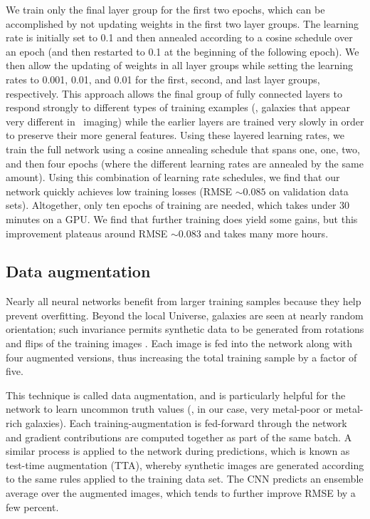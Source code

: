 \documentclass[fleqn,usenatbib]{mnras}
\begin{document}
We train only the final layer group for the first two epochs, which can be accomplished by not updating weights in the first two layer groups. The learning rate is initially set to 0.1 and then annealed according to a cosine schedule over an epoch (and then restarted to 0.1 at the beginning of the following epoch). We then allow the updating of weights in all layer groups while setting the learning rates to 0.001, 0.01, and 0.01 for the first, second, and last layer groups, respectively. This approach allows the final group of fully connected layers to respond strongly to different types of training examples (\eg, galaxies that appear very different in \sdssg\sdssr\sdssi\ imaging) while the earlier layers are trained very slowly in order to preserve their more general features. Using these layered learning rates, we train the full network using a cosine annealing schedule that spans one, one, two, and then four epochs (where the different learning rates are annealed by the same amount). Using this combination of learning rate schedules, we find that our network quickly achieves low training losses (RMSE $\sim 0.085$ on validation data sets). Altogether, only ten epochs of training are needed, which takes under 30 minutes on a GPU. We find that further training does yield some gains, but this improvement plateaus around RMSE $\sim 0.083$ and takes many more hours.

\subsection{Data augmentation}\label{sec:data aug}
Nearly all neural networks benefit from larger training samples because they help prevent overfitting. Beyond the local Universe, galaxies are seen at nearly random orientation; such invariance permits synthetic data to be generated from rotations and flips of the training images \citep[see, \eg,][]{2014arXiv1409.1556S}. Each image is fed into the network along with four augmented versions, thus increasing the total training sample by a factor of five.

This technique is called data augmentation, and is particularly helpful for the network to learn uncommon truth values (\eg, in our case, very metal-poor or metal-rich galaxies). Each training-augmentation is fed-forward through the network and gradient contributions are computed together as part of the same batch. A similar process is applied to the network during predictions, which is known as test-time augmentation (TTA), whereby synthetic images are generated according to the same rules applied to the training data set. The CNN predicts an ensemble average over the augmented images, which tends to further improve RMSE by a few percent.

\bsp	%
\label{lastpage}
\end{document}
